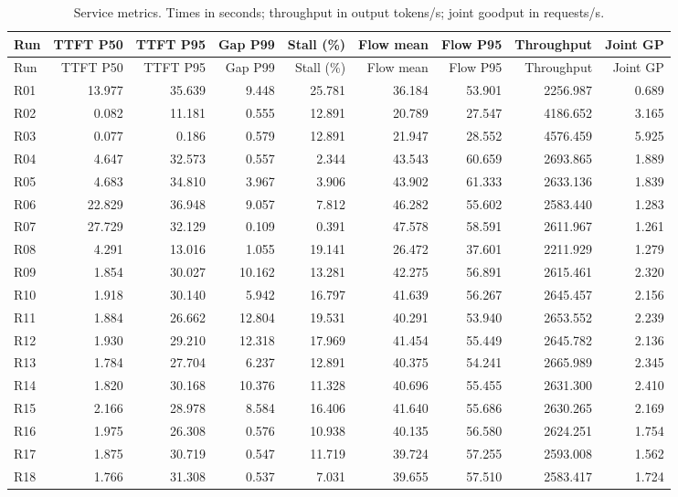 \begin{longtable}{lrrrrrrrr}
\caption{Service metrics. Times in seconds; throughput in output tokens/s; joint goodput in requests/s.}\\
\toprule
Run & TTFT P50 & TTFT P95 & Gap P99 & Stall (\%) & Flow mean & Flow P95 & Throughput & Joint GP\\\midrule\endfirsthead
\toprule
Run & TTFT P50 & TTFT P95 & Gap P99 & Stall (\%) & Flow mean & Flow P95 & Throughput & Joint GP\\\midrule\endhead
\bottomrule\endfoot
R01 & 13.977 & 35.639 & 9.448 & 25.781 & 36.184 & 53.901 & 2256.987 & 0.689\\
R02 & 0.082 & 11.181 & 0.555 & 12.891 & 20.789 & 27.547 & 4186.652 & 3.165\\
R03 & 0.077 & 0.186 & 0.579 & 12.891 & 21.947 & 28.552 & 4576.459 & 5.925\\
R04 & 4.647 & 32.573 & 0.557 & 2.344 & 43.543 & 60.659 & 2693.865 & 1.889\\
R05 & 4.683 & 34.810 & 3.967 & 3.906 & 43.902 & 61.333 & 2633.136 & 1.839\\
R06 & 22.829 & 36.948 & 9.057 & 7.812 & 46.282 & 55.602 & 2583.440 & 1.283\\
R07 & 27.729 & 32.129 & 0.109 & 0.391 & 47.578 & 58.591 & 2611.967 & 1.261\\
R08 & 4.291 & 13.016 & 1.055 & 19.141 & 26.472 & 37.601 & 2211.929 & 1.279\\
R09 & 1.854 & 30.027 & 10.162 & 13.281 & 42.275 & 56.891 & 2615.461 & 2.320\\
R10 & 1.918 & 30.140 & 5.942 & 16.797 & 41.639 & 56.267 & 2645.457 & 2.156\\
R11 & 1.884 & 26.662 & 12.804 & 19.531 & 40.291 & 53.940 & 2653.552 & 2.239\\
R12 & 1.930 & 29.210 & 12.318 & 17.969 & 41.454 & 55.449 & 2645.782 & 2.136\\
R13 & 1.784 & 27.704 & 6.237 & 12.891 & 40.375 & 54.241 & 2665.989 & 2.345\\
R14 & 1.820 & 30.168 & 10.376 & 11.328 & 40.696 & 55.455 & 2631.300 & 2.410\\
R15 & 2.166 & 28.978 & 8.584 & 16.406 & 41.640 & 55.686 & 2630.265 & 2.169\\
R16 & 1.975 & 26.308 & 0.576 & 10.938 & 40.135 & 56.580 & 2624.251 & 1.754\\
R17 & 1.875 & 30.719 & 0.547 & 11.719 & 39.724 & 57.255 & 2593.008 & 1.562\\
R18 & 1.766 & 31.308 & 0.537 & 7.031 & 39.655 & 57.510 & 2583.417 & 1.724\\

\end{longtable}
